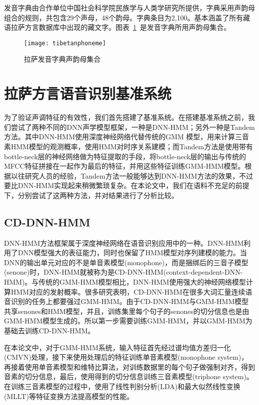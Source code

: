 发音字典由合作单位中国社会科学院民族学与人类学研究所提供，字典采用声韵母组合的规则，共包含29个声母，48个韵母。字典条目为2,100。基本涵盖了所有藏语拉萨方言数据库中出现的藏文字。图表~\ref{fig:tibetanphoneme}~是发音字典所用声韵母集合。
\begin{figure}[htbp]
\centering
\texttt{[image: tibetanphoneme]}
\caption{拉萨发音字典声韵母集合}\label{fig:tibetanphoneme}
\vspace{\baselineskip}
\end{figure}

\section{拉萨方言语音识别基准系统}
为了验证声调特征的有效性，我们首先搭建了基准系统。在搭建基准系统之前，我们尝试了两种不同的DNN声学模型框架，一种是DNN-HMM\cite{dahl2012context}；另外一种是Tandem方法\cite{hermansky2000tandem}。其中DNN-HMM使用深度神经网络代替传统的GMM 模型，用来计算三音素HMM模型的观测概率，使用HMM对时序关系建模；而Tandem方法是使用带有bottle-neck层的神经网络做为特征提取的手段，将bottle-neck层的输出与传统的MFCC特征拼接在一起作为最后的特征，并用这些特征训练GMM-HMM模型。根据以往研究人员的经验，Tandem方法一般能够达到DNN-HMM方法的效果，不过要比DNN-HMM实现起来稍微繁琐复杂。在本论文中，我们在语料不充足的前提下，分别尝试了这两种方法，并对结果进行了分析比较。
\subsection{CD-DNN-HMM}
DNN-HMM方法框架属于深度神经网络在语音识别应用中的一种。DNN-HMM利用了DNN模型强大的表征能力，同时也保留了HMM模型对序列建模的能力。当DNN的输出单元对应的不是单音素模型(monophone)，而是捆绑后的三音子模型(senone)时，DNN-HMM就被称为是CD-DNN-HMM(context-dependent-DNN-HMM)。与传统的GMM-HMM模型相比，DNN-HMM使用强大的神经网络模型计算HMM对应的发射概率。很多研究表明，CD-DNN-HMM在很多大词汇量连续语音识别的任务上都要强过GMM-HMM\cite{seide2011conversational}\cite{deng2013recent}\cite{yu2013deep}。由于CD-DNN-HMM与GMM-HMM模型共享senones和HMM模型，并且，训练集里每个句子的senones的切分信息也是由GMM-HMM模型生成的。所以第一步需要训练GMM-HMM，并以GMM-HMM为基础去训练CD-DNN-HMM。

在本论文中，对于GMM-HMM系统，输入特征首先经过谱均值方差归一化(CMVN)处理，接下来使用处理后的特征训练单音素模型(monophone system)，再接着使用单音素模型和维特比算法，对训练数据里的每个句子做强制对齐，得到音素的切分信息，最后，使用得到的切分信息训练三音素模型(triphone system)。在训练三音素模型的过程中，使用了线性判别分析(LDA)和最大似然线性变换(MLLT)等特征变换方法提高模型的性能。

